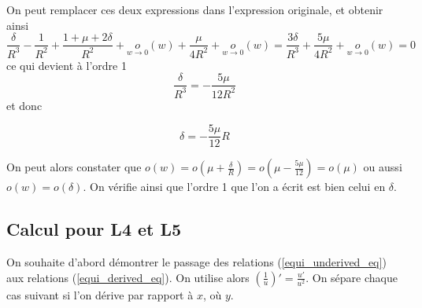 \documentclass[12pt]{article}
\theoremstyle{definition}
\theoremstyle{definition}
\begin{document}
	On peut remplacer ces deux expressions dans l'expression originale, et obtenir ainsi
	\begin{equation*}
		\frac{\delta}{R^3} - \frac{1}{R^2} + \frac{1+\mu+2\delta}{R^2} + \underset{w \to 0}{o}(w) + \frac{\mu}{4R^2} + \underset{w \to 0}{o}(w)
		= \frac{3\delta}{R^3} + \frac{5\mu}{4R^2} + \underset{w \to 0}{o}(w) = 0
	\end{equation*}
	ce qui devient à l'ordre 1
	\begin{equation*}
		\frac{\delta}{R^3} = -\frac{5\mu}{12R^2}
	\end{equation*}
	et donc
	\begin{tcolorbox}[colframe=black,boxrule=0.8pt,colback=white]
		\begin{equation*}
			\delta = - \frac{5\mu}{12}R
		\end{equation*}
	\end{tcolorbox}
	
	On peut alors constater que $o(w) = o(\mu + \frac{\delta}{R}) = o(\mu - \frac{5\mu}{12}) = o(\mu)$ ou aussi $o(w) = o(\delta)$. On vérifie ainsi que l'ordre 1 que l'on a écrit est bien celui en $\delta$.
	
	
	\clearpage
	\subsection*{Calcul pour L4 et L5}
	On souhaite d'abord démontrer le passage des relations (\ref{equi_underived_eq}) aux relations (\ref{equi_derived_eq}). On utilise alors $(\frac{1}{u})' = \frac{u'}{u^2}$. On sépare chaque cas suivant si l'on dérive par rapport à $x$, où $y$.	
	\\
	
\end{document}
